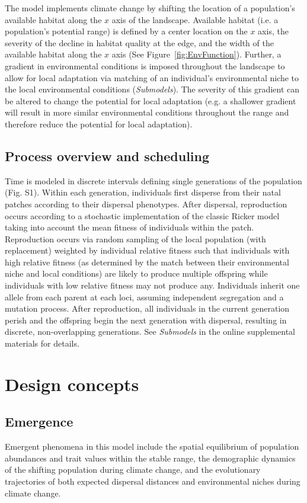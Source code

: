 \documentclass[12pt, oneside]{article}
\begin{document}
The model implements climate change by shifting the location of a population's available habitat along the $x$ axis of the landscape. Available habitat (i.e. a population's potential range) is defined by a center location on the $x$ axis, the severity of the decline in habitat quality at the edge, and the width of the available habitat along the $x$ axis (See Figure~\ref{fig:EnvFunction}). Further, a gradient in environmental conditions is imposed throughout the landscape to allow for local adaptation via matching of an individual's environmental niche to the local environmental conditions (\textit{Submodels}). The severity of this gradient can be altered to change the potential for local adaptation (e.g. a shallower gradient will result in more similar environmental conditions throughout the range and therefore reduce the potential for local adaptation).

\subsection*{Process overview and scheduling} 
Time is modeled in discrete intervals defining single generations of the population (Fig. S1). Within each generation, individuals first disperse from their natal patches according to their dispersal phenotypes. After dispersal, reproduction occurs according to a stochastic implementation of the classic Ricker model~\citep{ricker1954stock} taking into account the mean fitness of individuals within the patch. Reproduction occurs via random sampling of the local population (with replacement) weighted by individual relative fitness such that individuals with high relative fitness (as determined by the match between their environmental niche and local conditions) are likely to produce multiple offspring while individuals with low relative fitness may not produce any. Individuals inherit one allele from each parent at each loci, assuming independent segregation and a mutation process. After reproduction, all individuals in the current generation perish and the offspring begin the next generation with dispersal, resulting in discrete, non-overlapping generations. See \textit{Submodels} in the online supplemental materials for details. 

\section*{Design concepts}
\subsection*{Emergence} 
Emergent phenomena in this model include the spatial equilibrium of population abundances and trait values within the stable range, the demographic dynamics of the shifting population during climate change, and the evolutionary trajectories of both expected dispersal distances and environmental niches during climate change.
\end{document}
